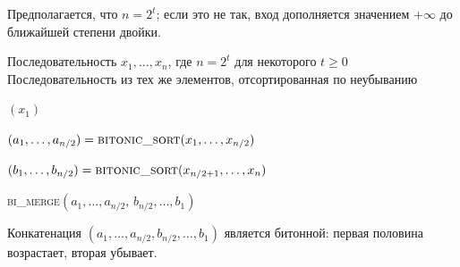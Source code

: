 Предполагается, что $n=2^t$; если это не так, вход дополняется значением $+\infty$ до ближайшей степени двойки.

\begin{algorithm}[H]
	\caption{\textsc{bitonic\_sort}$(x_1,\dots,x_n)$}
	\begin{algorithmic}[1]
		\Require Последовательность $x_1,\dots,x_n$, где $n = 2^t$ для некоторого $t \ge 0$
		\Ensure Последовательность из тех же элементов, отсортированная по неубыванию
		
		\State \Return $(x_1)$
		\EndIf
		
		\State $(a_1,\dots,a_{n/2}) = \textsc{bitonic\_sort}(x_1,\dots,x_{n/2})$
		
		\State $(b_1,\dots,b_{n/2}) = \textsc{bitonic\_sort}(x_{n/2+1},\dots,x_n)$
		
		\State \Return \textsc{bi\_merge}$(a_1,\dots,a_{n/2},\, b_{n/2},\dots,b_1)$
	\end{algorithmic}
\end{algorithm}

\noindent
Конкатенация $(a_1,\dots,a_{n/2},b_{n/2},\dots,b_1)$ является битонной: первая половина возрастает, вторая убывает.

